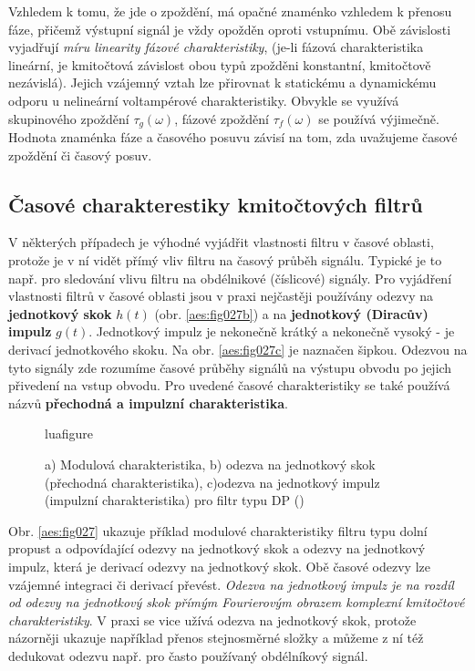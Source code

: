       Vzhledem k tomu, že jde o zpoždění, má opačné znaménko vzhledem k přenosu fáze, přičemž
      výstupní signál je vždy opožděn oproti vstupnímu. Obě závislosti vyjadřují \emph{míru
      linearity fázové charakteristiky}, (je-li fázová charakteristika lineární, je kmitočtová
      závislost obou typů zpožděni konstantní, kmitočtově nezávislá). Jejich vzájemný vztah lze
      přirovnat k statickému a dynamickému odporu u nelineární voltampérové charakteristiky.
      Obvykle se využívá skupinového zpoždění \(\tau_g(\omega)\), fázové zpoždění
      \(\tau_f(\omega)\) se používá výjimečně. Hodnota znaménka fáze a časového posuvu závisí na
      tom, zda uvažujeme časové zpoždění či časový posuv.      
    
    \subsection{Časové charakterestiky kmitočtových filtrů}  
      V některých případech je výhodné vyjádřit vlastnosti filtru v časové oblasti, protože je v ní
      vidět přímý vliv filtru na časový průběh signálu. Typické je to např. pro sledování vlivu
      filtru na obdélnikové (číslicové) signály. Pro vyjádření vlastnosti filtrů v časové oblasti
      jsou v praxi nejčastěji používány odezvy na \textbf{jednotkový skok} \(h(t)\) (obr.
      \ref{aes:fig027b}) a na \textbf{jednotkový (Diracův) impulz} \(g(t)\). Jednotkový impulz
      je nekonečně krátký a nekonečně vysoký - je derivací jednotkového skoku. Na obr.
      \ref{aes:fig027c} je naznačen šipkou. Odezvou na tyto signály zde rozumíme časové průběhy
      signálů na výstupu obvodu po jejich přivedení na vstup obvodu. Pro uvedené časové
      charakteristiky se také používá názvů \textbf{přechodná a impulzní charakteristika}. 

      \begin{figure}[ht!]
        \centering  luafigure
        \caption{a) Modulová charakteristika, b) odezva na jednotkový skok (přechodná
                charakteristika), c)odezva na jednotkový impulz (impulzní charakteristika) pro filtr
                typu DP (\cite[s.~30]{HajekSedlacek2002})}
                \label{aes:fig030}
      \end{figure}
      
      Obr. \ref{aes:fig027} ukazuje příklad modulové charakteristiky filtru typu dolní propust a
      odpovídající odezvy na jednotkový skok a odezvy na jednotkový impulz, která je derivací odezvy
      na jednotkový skok. Obě časové odezvy lze vzájemné integraci či derivací převést. \emph{Odezva
      na jednotkový impulz je na rozdíl od odezvy na jednotkový skok přímým Fourierovým obrazem
      komplexní kmitočtové charakteristiky}. V praxi se vice užívá odezva na jednotkový skok,
      protože názorněji ukazuje například přenos stejnosměrné složky a můžeme z ní též dedukovat
      odezvu např. pro často používaný obdélníkový signál. 

